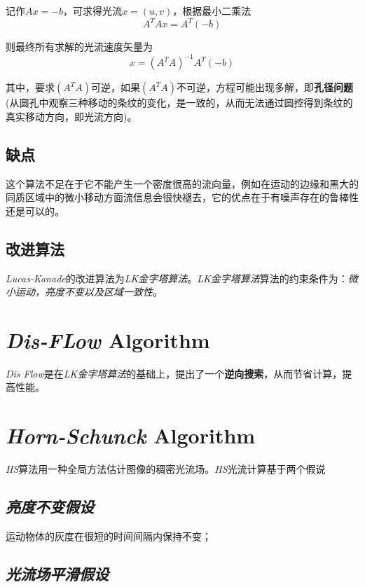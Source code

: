 记作$Ax=-b$，可求得光流$x=(u,v)$，根据最小二乘法
\begin{equation}
    A^TAx=A^T(-b)
\end{equation}

则最终所有求解的光流速度矢量为
\begin{equation}
    x=(A^{T} A)^{-1}A^T(-b)
\end{equation}

其中，要求$(A^TA)$可逆，如果$(A^TA)$不可逆，方程可能出现多解，即\textbf{孔径问题}(从圆孔中观察三种移动的条纹的变化，是一致的，从而无法通过圆控得到条纹的真实移动方向，即光流方向)。



\subsection*{缺点}

这个算法不足在于它不能产生一个密度很高的流向量，例如在运动的边缘和黑大的同质区域中的微小移动方面流信息会很快褪去，它的优点在于有噪声存在的鲁棒性还是可以的。

\subsection*{改进算法}

\textsl{Lucas-Kanade}的改进算法为\textsl{LK金字塔算法}。\textsl{LK金字塔算法}算法的约束条件为：\textsl{微小运动，亮度不变以及区域一致性}。

\section{\textsl{Dis-FLow} Algorithm}

\textsl{Dis Flow}是在\textsl{LK金字塔算法}的基础上，提出了一个\textbf{逆向搜索}，从而节省计算，提高性能。

\section{\textsl{Horn-Schunck} Algorithm}

\textsl{HS}算法用一种全局方法估计图像的稠密光流场。\textsl{HS}光流计算基于两个假说

\subsection*{\textsl{亮度不变假设}}

运动物体的灰度在很短的时间间隔内保持不变；

\subsection*{\textsl{光流场平滑假设}}

